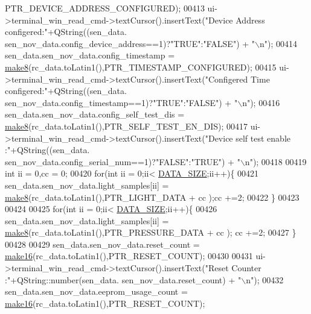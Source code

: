 \begin{DoxyCode}
      PTR\_DEVICE\_ADDRESS\_CONFIGURED);
00413       ui->terminal\_win\_read\_cmd->textCursor().insertText(\textcolor{stringliteral}{"Device Address configered:"}+QString((sen\_data.
      sen\_nov\_data.config\_device\_address==1)?\textcolor{stringliteral}{"TRUE"}:\textcolor{stringliteral}{"FALSE"}) + \textcolor{stringliteral}{"\(\backslash\)n"});
00414       sen\_data.sen\_nov\_data.config\_timestamp = \hyperlink{a00017_aebce94d5e6af7afff661daf74b208de1}{make8}(rc\_data.toLatin1(),PTR\_TIMESTAMP\_CONFIGURED);
00415       ui->terminal\_win\_read\_cmd->textCursor().insertText(\textcolor{stringliteral}{"Configered Time configered:"}+QString((sen\_data.
      sen\_nov\_data.config\_timestamp==1)?\textcolor{stringliteral}{"TRUE"}:\textcolor{stringliteral}{"FALSE"}) + \textcolor{stringliteral}{"\(\backslash\)n"});
00416       sen\_data.sen\_nov\_data.config\_self\_test\_dis = \hyperlink{a00017_aebce94d5e6af7afff661daf74b208de1}{make8}(rc\_data.toLatin1(),PTR\_SELF\_TEST\_EN\_DIS);
00417       ui->terminal\_win\_read\_cmd->textCursor().insertText(\textcolor{stringliteral}{"Device self test enable :"}+QString((sen\_data.
      sen\_nov\_data.config\_serial\_num==1)?\textcolor{stringliteral}{"FALSE"}:\textcolor{stringliteral}{"TRUE"}) + \textcolor{stringliteral}{"\(\backslash\)n"});
00418 
00419       \textcolor{keywordtype}{int} ii = 0,cc = 0;
00420       \textcolor{keywordflow}{for}(\textcolor{keywordtype}{int} ii = 0;ii< \hyperlink{a00110_af55149bc1f05cf18af067a302e31e3f9}{DATA\_SIZE};ii++)\{
00421           sen\_data.sen\_nov\_data.light\_samples[ii] = \hyperlink{a00017_aebce94d5e6af7afff661daf74b208de1}{make8}(rc\_data.toLatin1(),PTR\_LIGHT\_DATA + cc );cc 
      +=2;
00422       \}
00423 
00424 
00425       \textcolor{keywordflow}{for}(\textcolor{keywordtype}{int} ii = 0;ii< \hyperlink{a00110_af55149bc1f05cf18af067a302e31e3f9}{DATA\_SIZE};ii++)\{
00426           sen\_data.sen\_nov\_data.light\_samples[ii] = \hyperlink{a00017_aebce94d5e6af7afff661daf74b208de1}{make8}(rc\_data.toLatin1(),PTR\_PRESSURE\_DATA + cc );
      cc +=2;
00427       \}
00428 
00429       sen\_data.sen\_nov\_data.reset\_count = \hyperlink{a00017_afcb06d9f3a6a555df9355af1dfbb4e21}{make16}(rc\_data.toLatin1(),PTR\_RESET\_COUNT);
00430 
00431       ui->terminal\_win\_read\_cmd->textCursor().insertText(\textcolor{stringliteral}{"Reset Counter   :"}+QString::number(sen\_data.
      sen\_nov\_data.reset\_count) + \textcolor{stringliteral}{"\(\backslash\)n"});
00432       sen\_data.sen\_nov\_data.eeprom\_usage\_count = \hyperlink{a00017_afcb06d9f3a6a555df9355af1dfbb4e21}{make16}(rc\_data.toLatin1(),PTR\_RESET\_COUNT);

\end{DoxyCode}
